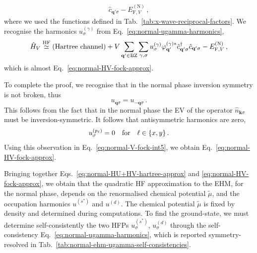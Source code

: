 \begin{tabproof}
\begin{multline}
		\hat c_{\mathbf{q}'\sigma} - E_{\mathrm{F},V}^{(\mathrm{N})} \, , \label{eq:normal-V-fock-int4}
	\end{multline}
	where we used the functions defined in Tab.~\ref{tab:x-wave-reciprocal-factors}. We recognise the harmonics $u_\sigma^{(\gamma)}$ from Eq.~\eqref{eq:normal-ugamma-harmonics},
	\begin{equation}\label{eq:normal-V-fock-int5}
		\hat H_V \stackrel{\mathrm{HF}}{\simeq} (\text{Hartree channel}) + V \sum_{\mathbf{q}'\in\mathrm{BZ}} \sum_{\gamma,\sigma} u_\sigma^{(\gamma)}
		\varphi_{\mathbf{q}'}^{(\gamma)*}
		\hat c_{\mathbf{q}'\sigma}^\dagger
		\hat c_{\mathbf{q}'\sigma} - E_{\mathrm{F},V}^{(\mathrm{N})} \, ,
	\end{equation}
	which is almost Eq.~\eqref{eq:normal-HV-fock-approx}. 
	
	To complete the proof, we recognise that in the normal phase inversion symmetry is not broken, thus
	\[
		u_{\mathbf{q}\sigma} = u_{-\mathbf{q}\sigma} \, .
	\]
	This follows from the fact that in the normal phase the EV of the operator $\hat n_{\mathbf{k}\sigma}$ must be inversion-symmetric. It follows that antisymmetric harmonics are zero,
	\begin{equation}\label{eq:normal-up=0}
		u_\sigma^{(p_\ell)} = 0
		\qq{for}
		\ell\in\lbrace x,y \rbrace \, .
	\end{equation}
	Using this observation in Eq.~\eqref{eq:normal-V-fock-int5}, we obtain Eq.~\eqref{eq:normal-HV-fock-approx}.
\end{tabproof}

Bringing together Eqs.~\eqref{eq:normal-HU+HV-hartree-approx} and \eqref{eq:normal-HV-fock-approx}, we obtain that the quadratic HF approximation to the EHM, for the normal phase, depends on the renormalised chemical potential $\tilde{\mu}$, and the occupation harmonics $u^{(s^*)}$ and $u^{(d)}$. The chemical potential $\tilde{\mu}$ is fixed by density and determined during computations. To find the ground-state, we must determine self-consistently the two HFPs $u_\sigma^{(s^*)}$, $u_\sigma^{(d)}$ through the self-consistency Eq.~\eqref{eq:normal-ugamma-harmonics}, which is reported symmetry-resolved in Tab.~\ref{tab:normal-ehm-ugamma-self-consistencies}.

